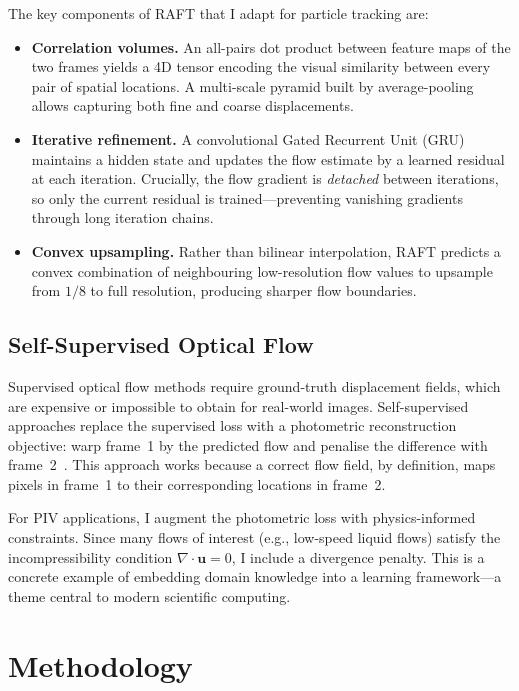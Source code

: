 \documentclass[11pt, a4paper]{article}
\newcommand{\vect}[1]{\bm{#1}}
\begin{document}
The key components of RAFT that I adapt for particle tracking are:
\begin{itemize}
    \item \textbf{Correlation volumes.} An all-pairs dot product between feature maps of the two frames yields a 4D tensor encoding the visual similarity between every pair of spatial locations. A multi-scale pyramid built by average-pooling allows capturing both fine and coarse displacements.
    \item \textbf{Iterative refinement.} A convolutional Gated Recurrent Unit (GRU)~\cite{cho2014gru} maintains a hidden state and updates the flow estimate by a learned residual at each iteration. Crucially, the flow gradient is \emph{detached} between iterations, so only the current residual is trained---preventing vanishing gradients through long iteration chains.
    \item \textbf{Convex upsampling.} Rather than bilinear interpolation, RAFT predicts a convex combination of neighbouring low-resolution flow values to upsample from $1/8$ to full resolution, producing sharper flow boundaries.
\end{itemize}

\subsection{Self-Supervised Optical Flow}

Supervised optical flow methods require ground-truth displacement fields, which are expensive or impossible to obtain for real-world images.
Self-supervised approaches replace the supervised loss with a photometric reconstruction objective: warp frame~1 by the predicted flow and penalise the difference with frame~2~\cite{jason2016back, meister2018unflow}.
This approach works because a correct flow field, by definition, maps pixels in frame~1 to their corresponding locations in frame~2.

For PIV applications, I augment the photometric loss with physics-informed constraints. Since many flows of interest (e.g., low-speed liquid flows) satisfy the incompressibility condition $\nabla \cdot \vect{u} = 0$, I include a divergence penalty. This is a concrete example of embedding domain knowledge into a learning framework---a theme central to modern scientific computing.

\section{Methodology}
\label{sec:method}
\end{document}
